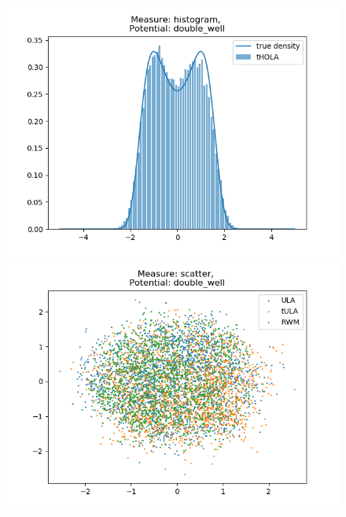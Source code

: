 \begin{figure}[H]
\centering
  \begin{minipage}[b]{0.3\textwidth}
  \centering
    \includegraphics[width=\textwidth]{Figures/histo_example.png}
  \end{minipage} %
  \begin{minipage}[b]{0.3\textwidth}
  \centering
    \includegraphics[width=\textwidth]{Figures/scatter_example.png}
  \end{minipage} %
  \begin{minipage}[b]{0.3\textwidth}
  \centering

\end{minipage}
\end{figure}
